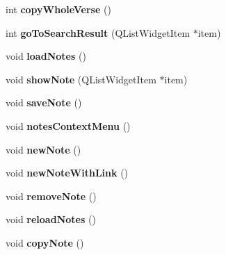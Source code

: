 \begin{CompactItemize}
\item 
\hypertarget{classMainWindow_9fd748b3a9c5997a1d2ab0d7a46eee7b}{
int \textbf{copyWholeVerse} ()}
\label{classMainWindow_9fd748b3a9c5997a1d2ab0d7a46eee7b}

\item 
\hypertarget{classMainWindow_d44fe74b12cbd31560fc707b66089bf4}{
int \textbf{goToSearchResult} (QListWidgetItem $\ast$item)}
\label{classMainWindow_d44fe74b12cbd31560fc707b66089bf4}

\item 
\hypertarget{classMainWindow_4bf3452bc55c8ba852a5c38db7204d51}{
void \textbf{loadNotes} ()}
\label{classMainWindow_4bf3452bc55c8ba852a5c38db7204d51}

\item 
\hypertarget{classMainWindow_f997a09a149a8900c18d8261f68a27ae}{
void \textbf{showNote} (QListWidgetItem $\ast$item)}
\label{classMainWindow_f997a09a149a8900c18d8261f68a27ae}

\item 
\hypertarget{classMainWindow_79d9f5029a4a7699917ec536dbbeaeba}{
void \textbf{saveNote} ()}
\label{classMainWindow_79d9f5029a4a7699917ec536dbbeaeba}

\item 
\hypertarget{classMainWindow_25b00fe21303e265f67acceaaaf6cddd}{
void \textbf{notesContextMenu} ()}
\label{classMainWindow_25b00fe21303e265f67acceaaaf6cddd}

\item 
\hypertarget{classMainWindow_e96d83550c8c4e55e2f2f5da3065f260}{
void \textbf{newNote} ()}
\label{classMainWindow_e96d83550c8c4e55e2f2f5da3065f260}

\item 
\hypertarget{classMainWindow_70d89156f31da73de1f72db1654cddcc}{
void \textbf{newNoteWithLink} ()}
\label{classMainWindow_70d89156f31da73de1f72db1654cddcc}

\item 
\hypertarget{classMainWindow_db4fe518f7a3b86c0d3cc4649170466e}{
void \textbf{removeNote} ()}
\label{classMainWindow_db4fe518f7a3b86c0d3cc4649170466e}

\item 
\hypertarget{classMainWindow_40eee957523541ce3de1f1cc4797b272}{
void \textbf{reloadNotes} ()}
\label{classMainWindow_40eee957523541ce3de1f1cc4797b272}

\item 
\hypertarget{classMainWindow_dfcbd8aa4aa6ad7889a91df04c6abd75}{
void \textbf{copyNote} ()}
\label{classMainWindow_dfcbd8aa4aa6ad7889a91df04c6abd75}


\end{CompactItemize}
